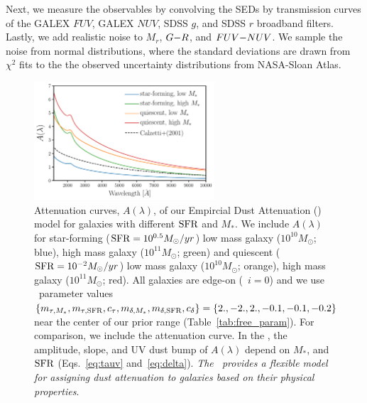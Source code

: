 Next, we measure the observables by convolving the SEDs by
transmission curves of the GALEX $FUV$, GALEX $NUV$, SDSS $g$, and SDSS $r$
broadband filters. Lastly, we add realistic noise to $M_r$, $G{-}R$, and $FUV{-}NUV$. 
We sample the noise from normal distributions, where the standard deviations 
are drawn from $\chi^2$ fits to the the observed uncertainty distributions from 
NASA-Sloan Atlas.



\begin{figure}
\begin{center}
    \includegraphics[width=0.6\textwidth]{figs/dems.pdf}
    \caption{\label{fig:dem_av}
    Attenuation curves, $A(\lambda)$, of our Empircial Dust Attenuation (\eda)
    model for galaxies with different ${\rm SFR}$ and $M_*$. We include $A(\lambda)$ for 
    star-forming (${\rm SFR}=10^{0.5}M_\odot/yr$) low mass galaxy ($10^{10}M_\odot$;
    blue), high mass galaxy ($10^{11}M_\odot$; green) and quiescent
    (${\rm SFR}=10^{-2}M_\odot/yr$) low mass galaxy ($10^{10}M_\odot$; orange), 
    high mass galaxy ($10^{11}M_\odot$; red). All galaxies are edge-on
    (\ie~$i=0$) and we use \eda~parameter values $\{m_{\tau,M_*}, m_{\tau,{\rm SFR}}, c_\tau, m_{\delta,M_*}, m_{\delta,{\rm SFR}},
    c_\delta\} = \{2., -2., 2., -0.1, -0.1, -0.2\}$ near the center of our prior range
    (Table~\ref{tab:free_param}). For comparison, we include the \cite{calzetti2001} 
    attenuation curve. In the \eda, the amplitude, slope, and UV dust bump of
    $A(\lambda)$ depend on $M_*$, and ${\rm SFR}$ (Eqs.~\ref{eq:tauv}
    and~\ref{eq:delta}). {\em The \eda~provides a flexible model for
    assigning dust attenuation to galaxies based on their physical properties}.
    } 
\end{center}
\end{figure}


